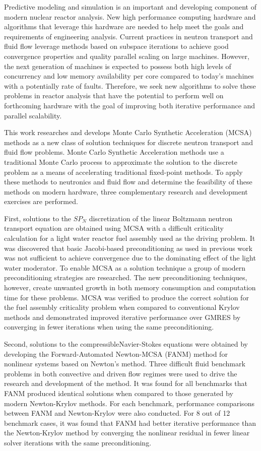 Predictive modeling and simulation is an important and developing
component of modern nuclear reactor analysis. New high performance
computing hardware and algorithms that leverage this hardware are
needed to help meet the goals and requirements of engineering
analysis. Current practices in neutron transport and fluid flow
leverage methods based on subspace iterations to achieve good
convergence properties and quality parallel scaling on large
machines. However, the next generation of machines is expected to
possess both high levels of concurrency and low memory availability
per core compared to today's machines with a potentially rate of
faults. Therefore, we seek new algorithms to solve these problems in
reactor analysis that have the potential to perform well on
forthcoming hardware with the goal of improving both iterative
performance and parallel scalability.

This work researches and develops Monte Carlo Synthetic Acceleration
(MCSA) methods as a new class of solution techniques for discrete
neutron transport and fluid flow problems. Monte Carlo Synthetic
Acceleration methods use a traditional Monte Carlo process to
approximate the solution to the discrete problem as a means of
accelerating traditional fixed-point methods. To apply these methods
to neutronics and fluid flow and determine the feasibility of these
methods on modern hardware, three complementary research and
development exercises are performed.

First, solutions to the $SP_N$ discretization of the linear Boltzmann
neutron transport equation are obtained using MCSA with a difficult
criticality calculation for a light water reactor fuel assembly used
as the driving problem. It was discovered that basic Jacobi-based
preconditioning as used in previous work was not sufficient to achieve
convergence due to the dominating effect of the light water
moderator. To enable MCSA as a solution technique a group of modern
preconditioning strategies are researched. The new preconditioning
techniques, however, create unwanted growth in both memory consumption
and computation time for these problems. MCSA was verified to produce
the correct solution for the fuel assembly criticality problem when
compared to conventional Krylov methods and demonstrated improved
iterative performance over GMRES by converging in fewer iterations
when using the same preconditioning.

Second, solutions to the compressibleNavier-Stokes equations were
obtained by developing the Forward-Automated Newton-MCSA (FANM) method
for nonlinear systems based on Newton's method. Three difficult fluid
benchmark problems in both convective and driven flow regimes were
used to drive the research and development of the method. It was found
for all benchmarks that FANM produced identical solutions when
compared to those generated by modern Newton-Krylov methods. For each
benchmark, performance comparisons between FANM and Newton-Krylov were
also conducted. For 8 out of 12 benchmark cases, it was found that
FANM had better iterative performance than the Newton-Krylov method by
converging the nonlinear residual in fewer linear solver iterations
with the same preconditioning.

